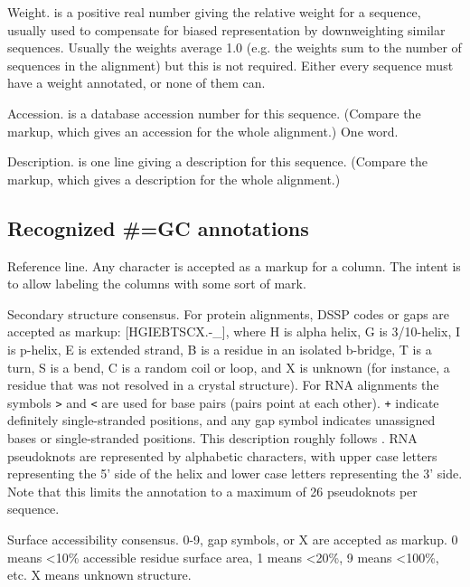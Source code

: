 \begin{wideitem}
\item [\emprog{WT  <f>}]
	Weight.  is a positive real number giving the
	relative weight for a sequence, usually used to compensate
	for biased representation by downweighting similar sequences.	
	Usually the weights average 1.0 (e.g. the weights sum to
	the number of sequences in the alignment) but this is not
	required. Either every sequence must have a weight annotated, 
	or none	of them can.  

\item [\emprog{AC  <s>}]
	Accession.  is a database accession number for 
	this sequence. (Compare the  markup, which gives
	an accession for the whole alignment.) One word. 
	
\item [\emprog{DE  <s>}]
	Description.  is one line giving a description for
	this sequence. (Compare the  markup, which gives
	a description for the whole alignment.)
\end{wideitem}


\subsection{Recognized #=GC annotations}

\begin{wideitem}
\item [\emprog{RF}]
	Reference line. Any character is accepted as a markup for a
	column. The intent is to allow labeling the columns with some
	sort of mark.
	
\item [\emprog{SS_cons}]
	Secondary structure consensus. For protein alignments,
	DSSP codes or gaps are accepted as markup: [HGIEBTSCX.-_], where
	H is alpha helix, G is 3/10-helix, I is p-helix, E is extended
	strand, B is a residue in an isolated b-bridge, T is a turn, 
	S is a bend, C is a random coil or loop, and X is unknown
	(for instance, a residue that was not resolved in a crystal
	structure). For RNA alignments
	the symbols \verb+>+ and \verb+<+ are
	used for base pairs (pairs point at each other).  \verb-+- indicate
	definitely single-stranded positions, and any gap symbol indicates
	unassigned bases or single-stranded positions.  This description
	roughly follows \cite{Konings89}. 
	RNA pseudoknots are represented by alphabetic characters, with upper
	case letters representing the 5' side of the helix and lower case
	letters representing the 3' side. Note that this limits the
	annotation to a maximum of 26 pseudoknots per sequence.
	

\item [\emprog{SA_cons}]
	Surface accessibility consensus. 0-9, gap symbols, or X are
	accepted as markup. 0 means <10\% accessible residue surface
	area, 1 means <20\%, 9 means <100\%, etc. X means unknown
	structure.
\end{wideitem}

